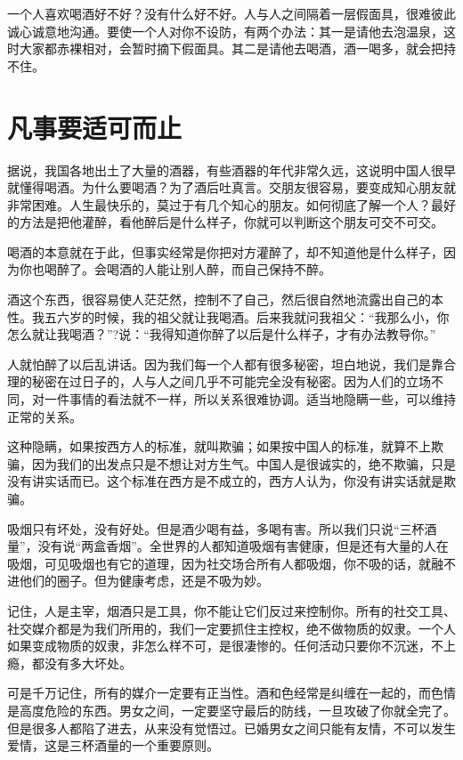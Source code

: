 \documentclass[fontset=fandol, a4paper, 12pt, openright]{ctexbook}
\begin{document}
一个人喜欢喝酒好不好？没有什么好不好。人与人之间隔着一层假面具，很难彼此诚心诚意地沟通。要使一个人对你不设防，有两个办法：其一是请他去泡温泉，这时大家都赤裸相对，会暂时摘下假面具。其二是请他去喝酒，酒一喝多，就会把持不住。

\section{凡事要适可而止}

据说，我国各地出土了大量的酒器，有些酒器的年代非常久远，这说明中国人很早就懂得喝酒。为什么要喝酒？为了酒后吐真言。交朋友很容易，要变成知心朋友就非常困难。人生最快乐的，莫过于有几个知心的朋友。如何彻底了解一个人？最好的方法是把他灌醉，看他醉后是什么样子，你就可以判断这个朋友可交不可交。

喝酒的本意就在于此，但事实经常是你把对方灌醉了，却不知道他是什么样子，因为你也喝醉了。会喝酒的人能让别人醉，而自己保持不醉。

酒这个东西，很容易使人茫茫然，控制不了自己，然后很自然地流露出自己的本性。我五六岁的时候，我的祖父就让我喝酒。后来我就问我祖父：“我那么小，你怎么就让我喝酒？”?说：“我得知道你醉了以后是什么样子，才有办法教导你。”

人就怕醉了以后乱讲话。因为我们每一个人都有很多秘密，坦白地说，我们是靠合理的秘密在过日子的，人与人之间几乎不可能完全没有秘密。因为人们的立场不同，对一件事情的看法就不一样，所以关系很难协调。适当地隐瞒一些，可以维持正常的关系。

这种隐瞒，如果按西方人的标准，就叫欺骗；如果按中国人的标准，就算不上欺骗，因为我们的出发点只是不想让对方生气。中国人是很诚实的，绝不欺骗，只是没有讲实话而已。这个标准在西方是不成立的，西方人认为，你没有讲实话就是欺骗。

吸烟只有坏处，没有好处。但是酒少喝有益，多喝有害。所以我们只说“三杯酒量”，没有说“两盒香烟”。全世界的人都知道吸烟有害健康，但是还有大量的人在吸烟，可见吸烟也有它的道理，因为社交场合所有人都吸烟，你不吸的话，就融不进他们的圈子。但为健康考虑，还是不吸为妙。

记住，人是主宰，烟酒只是工具，你不能让它们反过来控制你。所有的社交工具、社交媒介都是为我们所用的，我们一定要抓住主控权，绝不做物质的奴隶。一个人如果变成物质的奴隶，非怎么样不可，是很凄惨的。任何活动只要你不沉迷，不上瘾，都没有多大坏处。

可是千万记住，所有的媒介一定要有正当性。酒和色经常是纠缠在一起的，而色情是高度危险的东西。男女之间，一定要坚守最后的防线，一旦攻破了你就全完了。但是很多人都陷了进去，从来没有觉悟过。已婚男女之间只能有友情，不可以发生爱情，这是三杯酒量的一个重要原则。
\end{document}
